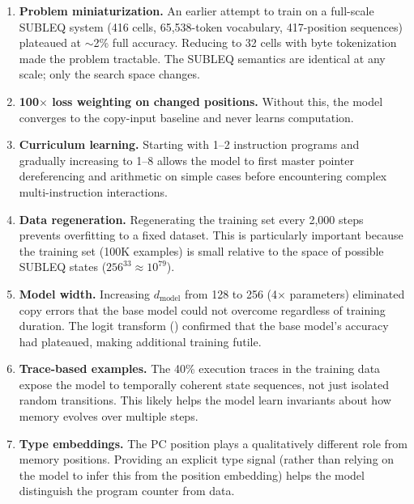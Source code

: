 \documentclass[11pt,a4paper]{article}
\begin{document}
\begin{enumerate}
  \item \textbf{Problem miniaturization.} An earlier attempt to train on a full-scale SUBLEQ system (416 cells, 65{,}538-token vocabulary, 417-position sequences) plateaued at $\sim$2\% full accuracy.
  Reducing to 32 cells with byte tokenization made the problem tractable.
  The SUBLEQ semantics are identical at any scale; only the search space changes.

  \item \textbf{100$\times$ loss weighting on changed positions.} Without this, the model converges to the copy-input baseline and never learns computation.

  \item \textbf{Curriculum learning.} Starting with 1--2 instruction programs and gradually increasing to 1--8 allows the model to first master pointer dereferencing and arithmetic on simple cases before encountering complex multi-instruction interactions.

  \item \textbf{Data regeneration.} Regenerating the training set every 2{,}000 steps prevents overfitting to a fixed dataset.
  This is particularly important because the training set (100K examples) is small relative to the space of possible SUBLEQ states ($256^{33} \approx 10^{79}$).

  \item \textbf{Model width.} Increasing $d_\text{model}$ from 128 to 256 (4$\times$ parameters) eliminated copy errors that the base model could not overcome regardless of training duration.
  The logit transform () confirmed that the base model's accuracy had plateaued, making additional training futile.

  \item \textbf{Trace-based examples.} The 40\% execution traces in the training data expose the model to temporally coherent state sequences, not just isolated random transitions.
  This likely helps the model learn invariants about how memory evolves over multiple steps.

  \item \textbf{Type embeddings.} The PC position plays a qualitatively different role from memory positions.
  Providing an explicit type signal (rather than relying on the model to infer this from the position embedding) helps the model distinguish the program counter from data.
\end{enumerate}
\end{document}
